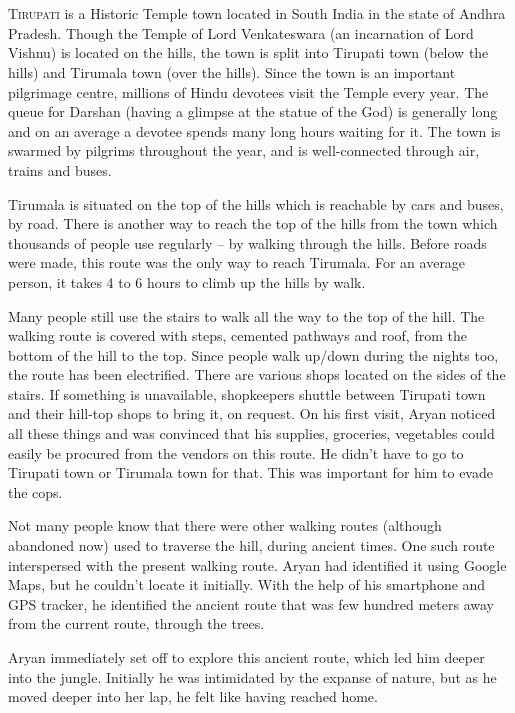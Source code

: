 \chapter{}

\lettrine{T}{irupati} is a Historic Temple town located in South India in the state of Andhra
Pradesh. Though the Temple of Lord Venkateswara (an incarnation of Lord Vishnu)
is located on the hills, the town is split into Tirupati town (below the hills)
and Tirumala town (over the hills). Since the town is an important pilgrimage
centre, millions of Hindu devotees visit the Temple every year. The queue for
Darshan (having a glimpse at the statue of the God) is generally long and on an
average a devotee spends many long hours waiting for it. The town is swarmed by
pilgrims throughout the year, and is well-connected through air, trains and
buses.

Tirumala is situated on the top of the hills which is reachable by cars and
buses, by road. There is another way to reach the top of the hills from the town
which thousands of people use regularly – by walking through the hills. Before
roads were made, this route was the only way to reach Tirumala. For an average
person, it takes 4 to 6 hours to climb up the hills by walk.

Many people still use the stairs to walk all the way to the top of the hill. The
walking route is covered with steps, cemented pathways and roof, from the bottom
of the hill to the top. Since people walk up/down during the nights too, the
route has been electrified. There are various shops located on the sides of the
stairs. If something is unavailable, shopkeepers shuttle between Tirupati town
and their hill-top shops to bring it, on request. On his first visit, Aryan
noticed all these things and was convinced that his supplies, groceries,
vegetables could easily be procured from the vendors on this route. He didn't
have to go to Tirupati town or Tirumala town for that. This was important for
him to evade the cops.

Not many people know that there were other walking routes (although abandoned
now) used to traverse the hill, during ancient times. One such route
interspersed with the present walking route. Aryan had identified it using
Google Maps, but he couldn't locate it initially. With the help of his
smartphone and GPS tracker, he identified the ancient route that was few hundred
meters away from the current route, through the trees.

Aryan immediately set off to explore this ancient route, which led him deeper
into the jungle. Initially he was intimidated by the expanse of nature, but as
he moved deeper into her lap, he felt like having reached home.

